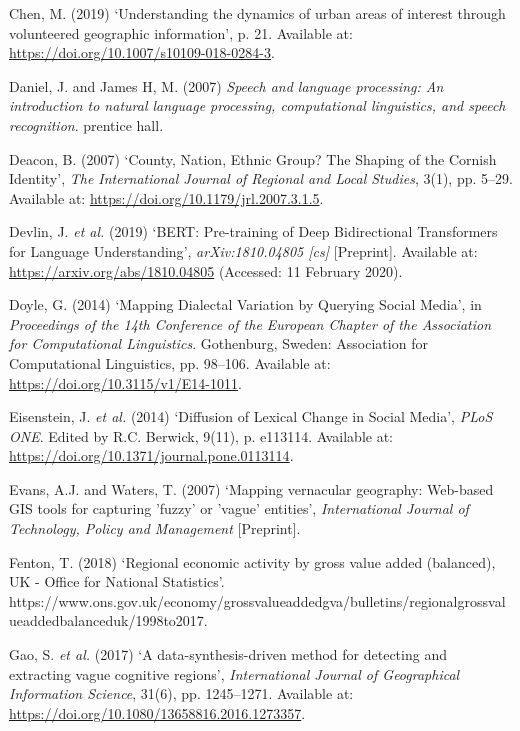 \documentclass[
]{article}
\newlength{\cslhangindent}
\newenvironment{CSLReferences}[2] %
 {\begin{list}{}{%
  \setlength{\itemindent}{0pt}
  \setlength{\leftmargin}{0pt}
  \setlength{\parsep}{0pt}
  \ifodd #1
   \setlength{\leftmargin}{\cslhangindent}
   \setlength{\itemindent}{-1\cslhangindent}
  \fi
  \setlength{\itemsep}{#2\baselineskip}}}
 {\end{list}}
\begin{document}
\begin{CSLReferences}{0}{1}
Chen, M. (2019) {`Understanding the dynamics of urban areas of interest
through volunteered geographic information'}, p. 21. Available at:
\url{https://doi.org/10.1007/s10109-018-0284-3}.

Daniel, J. and James H, M. (2007) \emph{Speech and language processing:
{An} introduction to natural language processing, computational
linguistics, and speech recognition}. {prentice hall}.

Deacon, B. (2007) {`County, {Nation}, {Ethnic Group}? {The Shaping} of
the {Cornish Identity}'}, \emph{The International Journal of Regional
and Local Studies}, 3(1), pp. 5--29. Available at:
\url{https://doi.org/10.1179/jrl.2007.3.1.5}.

Devlin, J. \emph{et al.} (2019) {`{BERT}: {Pre-training} of {Deep
Bidirectional Transformers} for {Language Understanding}'},
\emph{arXiv:1810.04805 {[}cs{]}} {[}Preprint{]}. Available at:
\url{https://arxiv.org/abs/1810.04805} (Accessed: 11 February 2020).

Doyle, G. (2014) {`Mapping {Dialectal Variation} by {Querying Social
Media}'}, in \emph{Proceedings of the 14th {Conference} of the {European
Chapter} of the {Association} for {Computational Linguistics}}.
{Gothenburg, Sweden}: {Association for Computational Linguistics}, pp.
98--106. Available at: \url{https://doi.org/10.3115/v1/E14-1011}.

Eisenstein, J. \emph{et al.} (2014) {`Diffusion of {Lexical Change} in
{Social Media}'}, \emph{PLoS ONE}. Edited by R.C. Berwick, 9(11), p.
e113114. Available at:
\url{https://doi.org/10.1371/journal.pone.0113114}.

Evans, A.J. and Waters, T. (2007) {`Mapping vernacular geography:
Web-based {GIS} tools for capturing 'fuzzy' or 'vague' entities'},
\emph{International Journal of Technology, Policy and Management}
{[}Preprint{]}.

Fenton, T. (2018) {`Regional economic activity by gross value added
(balanced), {UK} - {Office} for {National Statistics}'}.
https://www.ons.gov.uk/economy/grossvalueaddedgva/bulletins/regionalgrossvalueaddedbalanceduk/1998to2017.

Gao, S. \emph{et al.} (2017) {`A data-synthesis-driven method for
detecting and extracting vague cognitive regions'}, \emph{International
Journal of Geographical Information Science}, 31(6), pp. 1245--1271.
Available at: \url{https://doi.org/10.1080/13658816.2016.1273357}.


\end{CSLReferences}
\end{document}
